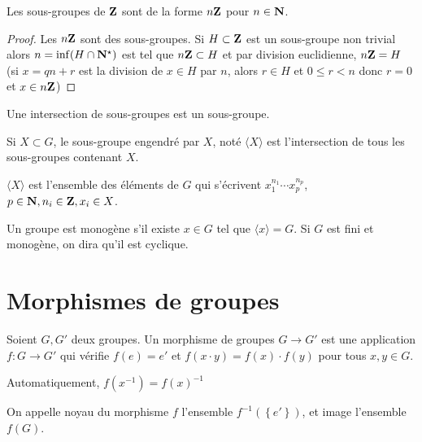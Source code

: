 \begin{prop}
Les sous-groupes de $\mathbf Z$ sont de la forme $n\mathbf Z$ pour $n \in  \mathbf N$.
\end{prop}

\begin{proof}
    Les $n\mathbf Z$ sont des sous-groupes. Si $H\subset \mathbf Z$ est un sous-groupe non trivial alors $n=\inf (H\cap \mathbf N^\star) $ est tel que $n\mathbf Z\subset H$ et par division euclidienne, $n\mathbf Z=H$ (si $x=qn+r$ est la division de  $x \in  H$ par $n$, alors $r\in H$ et $0\leq r<n$ donc $r=0$ et  $x \in  n\mathbf Z$)
\end{proof}

\begin{prop}
Une intersection de sous-groupes est un sous-groupe.
\end{prop}

\begin{dfn}
Si $X\subset G$, le sous-groupe engendré par  $X$, noté  $\langle X\rangle$ est l'intersection de tous les sous-groupes contenant  $X$.
\end{dfn}

\begin{prop}
    $\langle X\rangle$ est l'ensemble des éléments de  $G$ qui s'écrivent  $x_1^{n_1}\cdots x_p^{n_p}$, $p \in \mathbf N, n_i \in  \mathbf Z, x_i \in  X$.
\end{prop}

\begin{dfn}
    Un groupe est monogène s'il existe $x \in  G$ tel que $\langle x\rangle =G$. Si  $G$ est fini et monogène, on dira qu'il est cyclique.
\end{dfn}

\section{Morphismes de groupes}

\begin{dfn}
    Soient $G, G'$ deux groupes. Un morphisme de groupes $G \longrightarrow  G'$ est une application $f:G\longrightarrow G'$ qui vérifie $f(e)=e'$ et  $f(x\cdot y)=f(x)\cdot f(y)$ pour tous  $x,y \in  G$.
\end{dfn}

\begin{rem}
    Automatiquement, $f(x^{-1})=f(x)^{-1}$
\end{rem}

\begin{dfn}
    On appelle noyau du morphisme $f$ l'ensemble  $f^{-1} (\left\{ e' \right\} )$, et image l'ensemble  $f(G)$.
\end{dfn}

